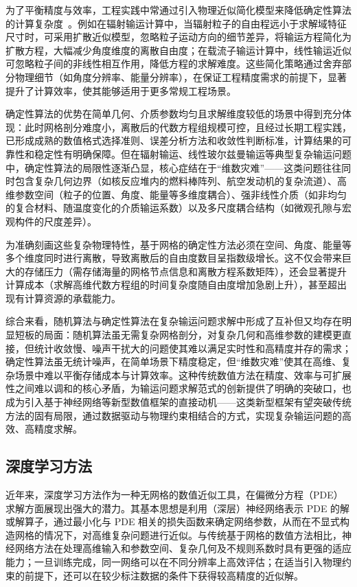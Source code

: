 为了平衡精度与效率，工程实践中常通过引入物理近似简化模型来降低确定性算法的计算复杂度~\cite{papanicolaou1975asymptotic,meinkohn2007numerical, machida2009diffusion}。例如在辐射输运计算中，当辐射粒子的自由程远小于求解域特征尺寸时，可采用扩散近似模型，忽略粒子运动方向的细节差异，将输运方程简化为扩散方程，大幅减少角度维度的离散自由度；在载流子输运计算中，线性输运近似可忽略粒子间的非线性相互作用，降低方程的求解难度。这些简化策略通过舍弃部分物理细节（如角度分辨率、能量分辨率），在保证工程精度需求的前提下，显著提升了计算效率，使其能够适用于更多常规工程场景。

确定性算法的优势在简单几何、介质参数均匀且求解维度较低的场景中得到充分体现：此时网格剖分难度小，离散后的代数方程组规模可控，且经过长期工程实践，已形成成熟的数值格式选择准则、误差分析方法和收敛性判断标准，计算结果的可靠性和稳定性有明确保障。但在辐射输运、线性玻尔兹曼输运等典型复杂输运问题中，确定性算法的局限性逐渐凸显，核心症结在于“维数灾难”——这类问题往往同时包含复杂几何边界（如核反应堆内的燃料棒阵列、航空发动机的复杂流道）、高维参数空间（粒子的位置、角度、能量等多维度耦合）、强非线性介质（如非均匀的复合材料、随温度变化的介质输运系数）以及多尺度耦合结构（如微观孔隙与宏观构件的尺度差异）。

为准确刻画这些复杂物理特性，基于网格的确定性方法必须在空间、角度、能量等多个维度同时进行离散，导致离散后的自由度数目呈指数级增长。这不仅会带来巨大的存储压力（需存储海量的网格节点信息和离散方程系数矩阵），还会显著提升计算成本（求解高维代数方程组的时间复杂度随自由度增加急剧上升），甚至超出现有计算资源的承载能力。

综合来看，随机算法与确定性算法在复杂输运问题求解中形成了互补但又均存在明显短板的局面：随机算法虽无需复杂网格剖分，对复杂几何和高维参数的建模更直接，但统计收敛慢、噪声干扰大的问题使其难以满足实时性和高精度并存的需求；确定性算法虽无统计噪声，在简单场景下精度稳定，但“维数灾难”使其在高维、复杂场景中难以平衡存储成本与计算效率。这种传统数值方法在精度、效率与可扩展性之间难以调和的核心矛盾，为输运问题求解范式的创新提供了明确的突破口，也成为引入基于神经网络等新型数值框架的直接动机——这类新型框架有望突破传统方法的固有局限，通过数据驱动与物理约束相结合的方式，实现复杂输运问题的高效、高精度求解。

\subsection{深度学习方法}

近年来，深度学习方法作为一种无网格的数值近似工具，在偏微分方程（PDE）求解方面展现出强大的潜力。其基本思想是利用（深层）神经网络表示 PDE 的解或解算子，通过最小化与 PDE 相关的损失函数来确定网络参数，从而在不显式构造网格的情况下，对高维复杂问题进行近似。与传统基于网格的数值方法相比，神经网络方法在处理高维输入和参数空间、复杂几何及不规则系数时具有更强的适应能力；一旦训练完成，同一网络可以在不同分辨率上高效评估；在适当引入物理约束的前提下，还可以在较少标注数据的条件下获得较高精度的近似解。

